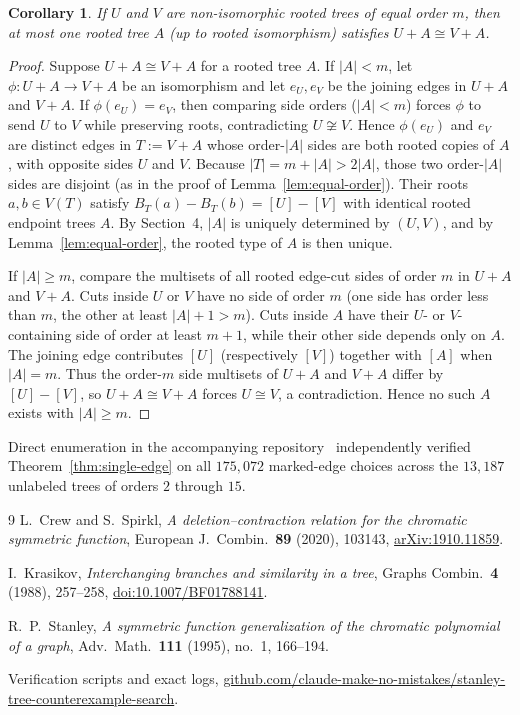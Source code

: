 \documentclass[10pt]{article}
\newtheorem{corollary}[theorem]{Corollary}
\begin{document}
\begin{corollary}\label{cor:unique-attachment}
If $U$ and $V$ are non-isomorphic rooted trees of equal order $m$, then at most one rooted tree $A$ (up to rooted isomorphism) satisfies $U+A\cong V+A$.
\end{corollary}

\begin{proof}
Suppose $U+A\cong V+A$ for a rooted tree $A$. If $|A|<m$, let $\phi\colon U+A\to V+A$ be an isomorphism and let $e_U,e_V$ be the joining edges in $U+A$ and $V+A$. If $\phi(e_U)=e_V$, then comparing side orders ($|A|<m$) forces $\phi$ to send $U$ to $V$ while preserving roots, contradicting $U\not\cong V$. Hence $\phi(e_U)$ and $e_V$ are distinct edges in $T := V+A$ whose order-$|A|$ sides are both rooted copies of $A$, with opposite sides $U$ and $V$. Because $|T|=m+|A|>2|A|$, those two order-$|A|$ sides are disjoint (as in the proof of Lemma~\ref{lem:equal-order}). Their roots $a,b\in V(T)$ satisfy $B_T(a)-B_T(b) = [U]-[V]$ with identical rooted endpoint trees $A$. By Section~4, $|A|$ is uniquely determined by $(U,V)$, and by Lemma~\ref{lem:equal-order}, the rooted type of $A$ is then unique.

If $|A|\ge m$, compare the multisets of all rooted edge-cut sides of order $m$ in $U+A$ and $V+A$. Cuts inside $U$ or $V$ have no side of order $m$ (one side has order less than $m$, the other at least $|A|+1>m$). Cuts inside $A$ have their $U$- or $V$-containing side of order at least $m+1$, while their other side depends only on $A$. The joining edge contributes $[U]$ (respectively $[V]$) together with $[A]$ when $|A|=m$. Thus the order-$m$ side multisets of $U+A$ and $V+A$ differ by $[U]-[V]$, so $U+A\cong V+A$ forces $U\cong V$, a contradiction. Hence no such $A$ exists with $|A|\ge m$.
\end{proof}

Direct enumeration in the accompanying repository~\cite{repo} independently verified Theorem~\ref{thm:single-edge} on all $175{,}072$ marked-edge choices across the $13{,}187$ unlabeled trees of orders $2$ through $15$.

\begin{thebibliography}{9}
L.~Crew and S.~Spirkl,
\emph{A deletion--contraction relation for the chromatic symmetric function},
European J.\ Combin.\ \textbf{89} (2020), 103143,
\href{https://arxiv.org/abs/1910.11859}{arXiv:1910.11859}.

I.~Krasikov,
\emph{Interchanging branches and similarity in a tree},
Graphs Combin.\ \textbf{4} (1988), 257--258,
\href{https://doi.org/10.1007/BF01788141}{doi:10.1007/BF01788141}.

R.~P.~Stanley,
\emph{A symmetric function generalization of the chromatic polynomial of a graph},
Adv.\ Math.\ \textbf{111} (1995), no.~1, 166--194.

Verification scripts and exact logs,
\href{https://github.com/claude-make-no-mistakes/stanley-tree-counterexample-search}{github.com/claude-make-no-mistakes/stanley-tree-counterexample-search}.
\end{thebibliography}
\end{document}
